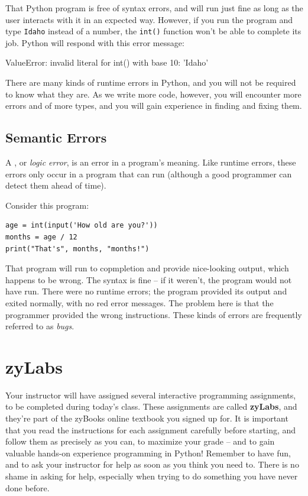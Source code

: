 That Python program is free of syntax errors, and will run just fine as long as the user interacts with it in an expected way.  However, if you run the program and type \texttt{Idaho} instead of a number, the \texttt{int()} function won't be able to complete its job.  Python will respond with this error message:

\begin{tcolorbox}
\ttfamily\small ValueError: invalid literal for int() with base 10: 'Idaho'
\end{tcolorbox}

There are many kinds of runtime errors in Python, and you will not be required to know what they are.  As we write more code, however, you will encounter more errors and of more types, and you will gain experience in finding and fixing them.

\subsection{Semantic Errors}

A , or \textit{logic error}, is an error in a program's meaning.  Like runtime errors, these errors only occur in a program that can run (although a good programmer can detect them ahead of time).

Consider this program:
\begin{verbatim}
age = int(input('How old are you?'))
months = age / 12
print("That's", months, "months!")
\end{verbatim}

That program will run to copmpletion and provide nice-looking output, which happens to be wrong.  The syntax is fine -- if it weren't, the program would not have run.  There were no runtime errors; the program provided its output and exited normally, with no red error messages.  The problem here is that the programmer provided the wrong instructions.  These kinds of errors are frequently referred to as \textit{bugs}.

\section{zyLabs}

Your instructor will have assigned several interactive programming assignments, to be completed during today's class.  These assignments are called \textbf{zyLabs}, and they're part of the zyBooks online textbook you signed up for.  It is important that you read the instructions for each assignment carefully before starting, and follow them as precisely as you can, to maximize your grade -- and to gain valuable hands-on experience programming in Python!  Remember to have fun, and to ask your instructor for help as soon as you think you need to.  There is no shame in asking for help, especially when trying to do something you have never done before.